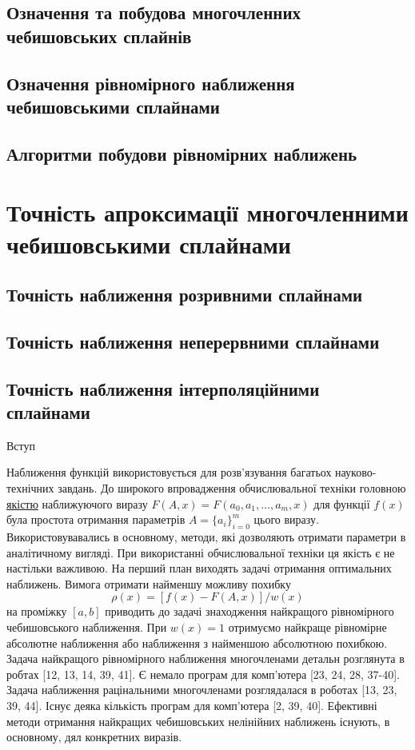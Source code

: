 \documentclass[ukrainian,14pt]{extarticle}
\begin{document}
\newpage

\subsection{Означення та побудова многочленних чебишовських сплайнів}

\subsection{Означення рівномірного наближення чебишовськими сплайнами}

\subsection{Алгоритми побудови рівномірних наближень}

\section{Точність апроксимації многочленними чебишовськими сплайнами}

\subsection{Точність наближення розривними сплайнами}

\subsection{Точність наближення неперервними сплайнами}

\subsection{Точність наближення інтерполяційними сплайнами}


Вступ

Наближення функцій використовується для розв'язування багатьох науково-технічних завдань.
До широкого впровадження обчислювальної техніки головною \underline{якістю} наближуючого виразу 
$F(A, x) = F(a_0, a_1, \ldots, a_m, x)$ для функції $f(x)$ була простота отримання параметрів $A=\{a_i\}_{i=0}^m$ цього виразу. Використовувавались в основному, методи, які дозволяють отримати параметри в аналітичному вигляді. При використанні обчислювальної техніки ця якість є не настільки важливою. На перший план виходять задачі отримання оптимальних наближень. Вимога отримати найменшу можливу похибку
$$\rho(x) = [f(x) - F(A, x)] / w(x)$$
на проміжку $[a, b]$ приводить до задачі знаходження найкращого рівномірного чебишовського наближення. При $w(x) = 1$ отримуємо найкраще рівномірне абсолютне наближення або наближення з найменшою абсолютною похибкою.
Задача найкращого рівномірного наближення многочленами детальн розглянута в робтах [12, 13, 14, 39, 41]. Є немало програм для комп'ютера [23, 24, 28, 37-40]. Задача наближення рацінальними многочленами розглядалася в роботах [13, 23, 39, 44]. Існує деяка кількість програм для комп'ютера [2, 39, 40]. 
Ефективні методи отримання найкращих чебишовських нелінійних наближень існують, в основному, дял конкретних виразів.
\end{document}
